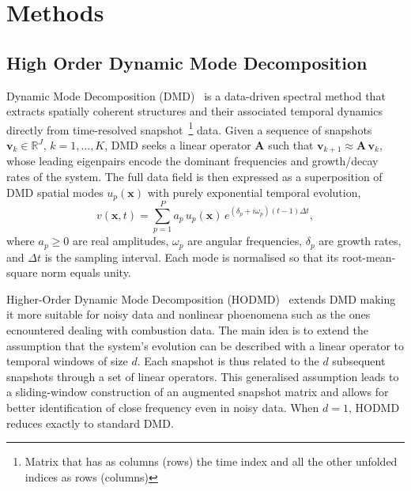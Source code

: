 
\section{Methods}
\label{sec:methods}

\subsection{High Order Dynamic Mode Decomposition}
\label{sec:dmd_hodmd}

Dynamic Mode Decomposition (DMD)~\cite{schmid2010}  is a data-driven spectral method that extracts spatially coherent structures and their associated temporal dynamics directly from time-resolved snapshot~\footnote{Matrix that has as columns (rows) the time index and all the other unfolded indices as rows (columns)} data.
Given a sequence of snapshots $\mathbf{v}_k \in \mathbb{R}^{J}$, $k = 1,\dots,K$, DMD seeks a linear operator $\mathbf{A}$ such that $\mathbf{v}_{k+1} \approx \mathbf{A}\,\mathbf{v}_k$, whose leading eigenpairs encode the dominant frequencies and growth/decay rates of the system.
The full data field is then expressed as a superposition of DMD spatial modes $u_p(\mathbf{x})$ with purely exponential temporal evolution,
\begin{equation}
    v(\mathbf{x},t) = \sum_{p=1}^{P} a_p\, u_p(\mathbf{x})\, e^{(\delta_p + i\omega_p)(t-1)\Delta t},
    \label{eq:dmd_expansion}
\end{equation}
where $a_p \geq 0$ are real amplitudes, $\omega_p$ are angular frequencies, $\delta_p$ are growth rates, and $\Delta t$ is the sampling interval.
Each mode is normalised so that its root-mean-square norm equals unity.

Higher-Order Dynamic Mode Decomposition (HODMD)~\cite{leclainche2017} extends DMD making it more suitable for noisy data and nonlinear phoenomena such as the ones ecnountered dealing with combustion data. The main idea is to extend the assumption that the system's evolution can be described with a linear operator to temporal windows of size $d$. Each snapshot is thus related to the $d$ subsequent snapshots through a set of linear operators.
This generalised assumption leads to a sliding-window construction of an augmented snapshot matrix and allows for better identification of close frequency even in noisy data. When $d = 1$, HODMD reduces exactly to standard DMD.

